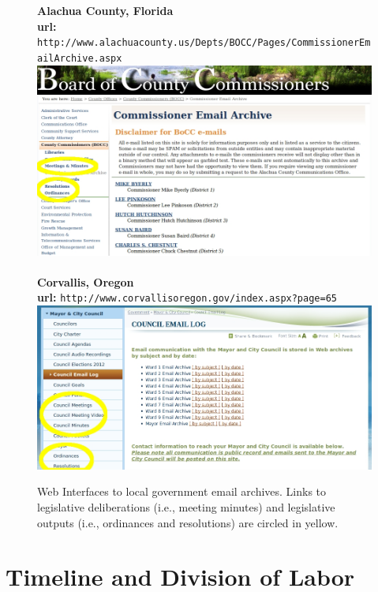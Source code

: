 \begin{figure}
\begin{center}
{\bf Alachua County, Florida} \\
 {\bf url:} \texttt{http://www.alachuacounty.us/Depts/BOCC/Pages/CommissionerEmailArchive.aspx} \\
 \includegraphics[scale=.45]{AlachuaBOCC.jpg} \\~\\
 {\bf Corvallis, Oregon} \\
 {\bf url:} \texttt{http://www.corvallisoregon.gov/index.aspx?page=65} \\
  \includegraphics[scale=.45]{CorvallisOR.jpg}
\end{center}
\caption{Web Interfaces to local government email archives. Links to legislative deliberations (i.e., meeting minutes) and legislative outputs (i.e., ordinances and resolutions) are circled in yellow.}
\end{figure}




\section{Timeline and Division of Labor}

